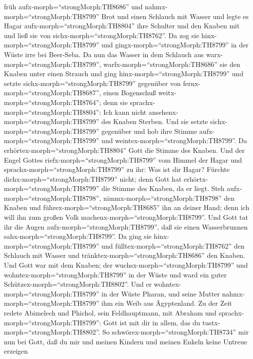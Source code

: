 früh aufx-morph=``strongMorph:TH8686'' und
nahmx-morph=``strongMorph:TH8799'' Brot und einen Schlauch mit Wasser
und legte es Hagar aufx-morph=``strongMorph:TH8804'' ihre Schulter und
den Knaben mit und ließ sie von sichx-morph=``strongMorph:TH8762''. Da
zog sie hinx-morph=``strongMorph:TH8799'' und
gingx-morph=``strongMorph:TH8799'' in der Wüste irre bei Beer-Seba.
 Da nun das Wasser in dem Schlauch aus
warx-morph=``strongMorph:TH8799'', warfx-morph=``strongMorph:TH8686''
sie den Knaben unter einen Strauch  und ging
hinx-morph=``strongMorph:TH8799'' und setzte
sichx-morph=``strongMorph:TH8799'' gegenüber von
fernx-morph=``strongMorph:TH8687'', einen Bogenschuß
weitx-morph=``strongMorph:TH8764''; denn sie
sprachx-morph=``strongMorph:TH8804'': Ich kann nicht
ansehenx-morph=``strongMorph:TH8799'' des Knaben Sterben. Und sie setzte
sichx-morph=``strongMorph:TH8799'' gegenüber und hob ihre Stimme
aufx-morph=``strongMorph:TH8799'' und
weintex-morph=``strongMorph:TH8799''.  Da
erhörtex-morph=``strongMorph:TH8804'' Gott die Stimme des Knaben. Und
der Engel Gottes riefx-morph=``strongMorph:TH8799'' vom Himmel der Hagar
und sprachx-morph=``strongMorph:TH8799'' zu ihr: Was ist dir Hagar?
Fürchte dichx-morph=``strongMorph:TH8799'' nicht; denn Gott hat
erhörtx-morph=``strongMorph:TH8799'' die Stimme des Knaben, da er liegt.
 Steh aufx-morph=``strongMorph:TH8798'',
nimmx-morph=``strongMorph:TH8798'' den Knaben und
führex-morph=``strongMorph:TH8685'' ihn an deiner Hand; denn ich will
ihn zum großen Volk machenx-morph=``strongMorph:TH8799''. 
Und Gott tat ihr die Augen aufx-morph=``strongMorph:TH8799'', daß sie
einen Wasserbrunnen sahx-morph=``strongMorph:TH8799''. Da ging sie
hinx-morph=``strongMorph:TH8799'' und
fülltex-morph=``strongMorph:TH8762'' den Schlauch mit Wasser und
tränktex-morph=``strongMorph:TH8686'' den Knaben.  Und Gott
war mit dem Knaben; der wuchsx-morph=``strongMorph:TH8799'' und
wohntex-morph=``strongMorph:TH8799'' in der Wüste und ward ein guter
Schützex-morph=``strongMorph:TH8802''.  Und er
wohntex-morph=``strongMorph:TH8799'' in der Wüste Pharan, und seine
Mutter nahmx-morph=``strongMorph:TH8799'' ihm ein Weib aus Ägyptenland.
 Zu der Zeit redete Abimelech und Phichol, sein
Feldhauptmann, mit Abraham und sprachx-morph=``strongMorph:TH8799'':
Gott ist mit dir in allem, das du tustx-morph=``strongMorph:TH8802''.
 So schwörex-morph=``strongMorph:TH8734'' mir nun bei Gott,
daß du mir und meinen Kindern und meinen Enkeln keine Untreue erzeigen
